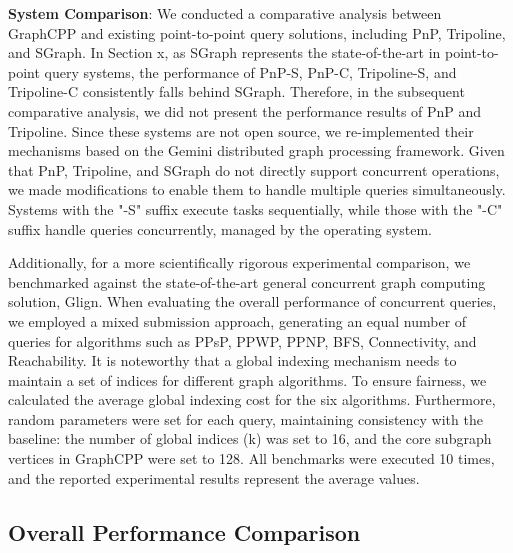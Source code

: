 \documentclass[lettersize,journal]{IEEEtran} %
\begin{document}
{\bf{System Comparison}}: We conducted a comparative analysis between GraphCPP and existing point-to-point query solutions, including PnP\cite{pnp}, Tripoline\cite{tripoline}, and SGraph\cite{sgraph}. In Section x, as SGraph represents the state-of-the-art in point-to-point query systems, the performance of PnP-S, PnP-C, Tripoline-S, and Tripoline-C consistently falls behind SGraph. Therefore, in the subsequent comparative analysis, we did not present the performance results of PnP and Tripoline. Since these systems are not open source, we re-implemented their mechanisms based on the Gemini distributed graph processing framework. Given that PnP, Tripoline, and SGraph do not directly support concurrent operations, we made modifications to enable them to handle multiple queries simultaneously. Systems with the "-S" suffix execute tasks sequentially, while those with the "-C" suffix handle queries concurrently, managed by the operating system.

Additionally, for a more scientifically rigorous experimental comparison, we benchmarked against the state-of-the-art general concurrent graph computing solution, Glign. When evaluating the overall performance of concurrent queries, we employed a mixed submission approach, generating an equal number of queries for algorithms such as PPsP, PPWP, PPNP, BFS, Connectivity, and Reachability. It is noteworthy that a global indexing mechanism needs to maintain a set of indices for different graph algorithms. To ensure fairness, we calculated the average global indexing cost for the six algorithms. Furthermore, random parameters were set for each query, maintaining consistency with the baseline: the number of global indices (k) was set to 16, and the core subgraph vertices in GraphCPP were set to 128. All benchmarks were executed 10 times, and the reported experimental results represent the average values.
 

\subsection{Overall Performance Comparison}
\end{document}
